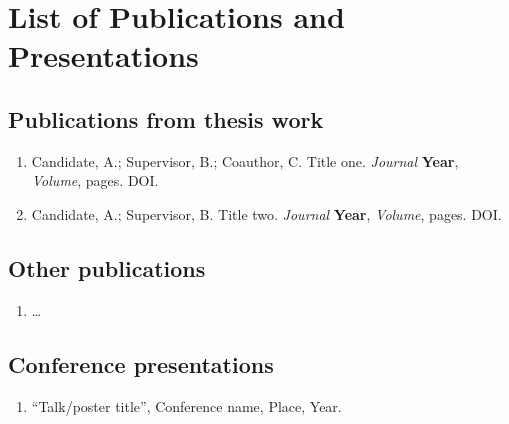 \chapter{List of Publications and Presentations}
\label{app:pubs}

\section{Publications from thesis work}
\begin{enumerate}
  \item Candidate, A.; Supervisor, B.; Coauthor, C. Title one. \emph{Journal} \textbf{Year}, \emph{Volume}, pages. DOI.
  \item Candidate, A.; Supervisor, B. Title two. \emph{Journal} \textbf{Year}, \emph{Volume}, pages. DOI.
\end{enumerate}

\section{Other publications}
\begin{enumerate}
  \item \ldots{}
\end{enumerate}

\section{Conference presentations}
\begin{enumerate}
  \item ``Talk/poster title'', Conference name, Place, Year.
\end{enumerate}
